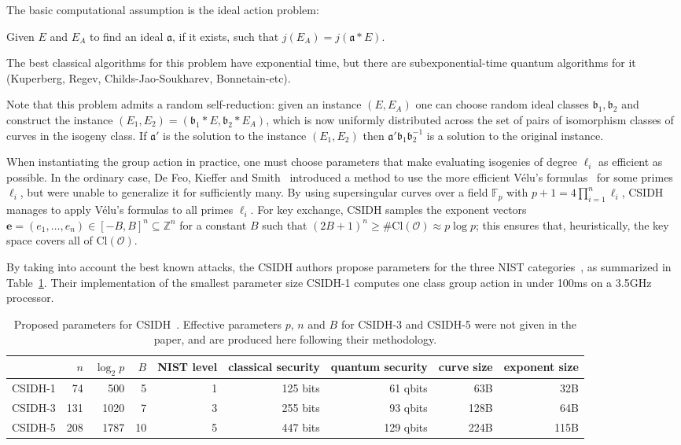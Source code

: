 \documentclass{llncs}
\newcommand{\F}{\mathbb{F}}
\newcommand{\OO}{\mathcal{O}}
\newcommand{\Z}{\mathbb{Z}}
\newcommand{\Cl}{\text{Cl}}
\renewcommand{\a}{\mathfrak{a}}
\renewcommand{\b}{\mathfrak{b}}
\newcommand{\e}{\textbf{e}}
\begin{document}
The basic computational assumption is the ideal action problem:

\begin{definition}\label{defn:ass1}
Given $E$ and $E_A$ to find an ideal $\a$, if it exists, such that $j( E_A ) = j( \a * E )$.
\end{definition}

The best classical algorithms for this problem have exponential time, but there are subexponential-time quantum algorithms for it~\cite{Kup,regev04,childs2014constructing,Kuperberg2013} (Kuperberg, Regev, Childs-Jao-Soukharev, Bonnetain-etc).

Note that this problem admits a random self-reduction: given an instance $(E, E_A)$ one can choose random ideal classes $\b_1, \b_2$ and construct the instance $(E_1, E_2) = (\b_1 * E, \b_2 * E_A )$, which is now uniformly distributed across the set of pairs of isomorphism classes of curves in the isogeny class.
If $\a'$ is the solution to the instance $(E_1, E_2)$ then $\a'\b_1 \b_2^{-1}$ is a solution to the original instance.

When instantiating the group action in practice, one must choose parameters that make evaluating isogenies of degree $\ell_i$ as efficient as possible.
In the ordinary case, De Feo, Kieffer and Smith~\cite{DFKS18} introduced a method to use the more efficient V\'elu's formulas~\cite{velu71} for some primes $\ell_i$, but were unable to generalize it for sufficiently many.
By using supersingular curves over a field $\F_p$ with $p+1 = 4\prod_{i=1}^n\ell_i$, CSIDH~\cite{CLMPR18} manages to apply V\'elu's formulas to all primes $\ell_i$.
For key exchange, CSIDH samples the exponent vectors $\e = (e_1, \dots, e_n) \in [-B,B]^n \subseteq \Z^n$ for a constant $B$ such that $(2B+1)^n\ge\#\Cl(\OO)\approx p\log p$; this ensures that, heuristically, the key space covers all of $\Cl(\OO)$.

By taking into account the best known attacks, the CSIDH authors propose parameters for the three NIST categories~\cite{NIST2016}, as summarized in Table~\ref{tab:csidh-parms}.
Their implementation of the smallest parameter size CSIDH-1 computes one class group action in under 100ms on a 3.5GHz processor.


\begin{table}
  \centering
  \begin{tabular}{l | r | r | r | r | r | r | r | r}
    & $n$ & $\log_2 p$ & $B$ & NIST level & classical security & quantum security & curve size & exponent size \\
    \hline
    CSIDH-1 &  74 &  500 &  5 & 1 & 125 bits &  61 qbits &  63B &  32B\\
    CSIDH-3 & 131 & 1020 &  7 & 3 & 255 bits &  93 qbits & 128B &  64B\\
    CSIDH-5 & 208 & 1787 & 10 & 5 & 447 bits & 129 qbits & 224B & 115B
  \end{tabular}
  \caption{Proposed parameters for CSIDH~\cite{CLMPR18}.  Effective
    parameters $p$, $n$ and $B$ for CSIDH-3 and CSIDH-5 were not given
    in the paper, and are produced here following their methodology.}
  \label{tab:csidh-parms}
\end{table}
\end{document}
